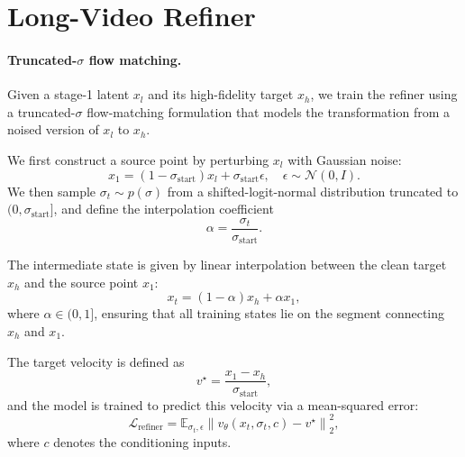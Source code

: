 \appendix








\section{Long-Video Refiner}
\label{sec:appendix_refiner}

\paragraph{Truncated-$\sigma$ flow matching.}
Given a stage-1 latent $x_l$ and its high-fidelity target $x_h$, we train the
refiner using a truncated-$\sigma$ flow-matching formulation that models the
transformation from a noised version of $x_l$ to $x_h$.

\noindent We first construct a source point by perturbing $x_l$ with Gaussian noise:
\begin{equation}
x_1 = (1 - \sigma_{\text{start}}) x_l + \sigma_{\text{start}} \epsilon,
\quad \epsilon \sim \mathcal{N}(0, I).
\end{equation}
We then sample $\sigma_t \sim p(\sigma)$ from a shifted-logit-normal
distribution truncated to $(0, \sigma_{\text{start}}]$, and define the
interpolation coefficient
\begin{equation}
    \alpha = \frac{\sigma_t}{\sigma_{\text{start}}}.
\end{equation}

\noindent The intermediate state is given by linear interpolation between the clean
target $x_h$ and the source point $x_1$:
\begin{equation}
    x_t = (1 - \alpha) x_h + \alpha x_1,
\end{equation}
where $\alpha \in (0,1]$, ensuring that all training states lie on the segment
connecting $x_h$ and $x_1$.

\noindent The target velocity is defined as
\begin{equation}
    v^\star = \frac{x_1 - x_h}{\sigma_{\text{start}}},
\end{equation}
and the model is trained to predict this velocity via a mean-squared error:
\begin{equation}
\mathcal{L}_{\text{refiner}} =
\mathbb{E}_{\sigma_t, \epsilon}
\left\| v_\theta(x_t, \sigma_t, c) - v^\star \right\|_2^2,    
\end{equation}
where $c$ denotes the conditioning inputs.

